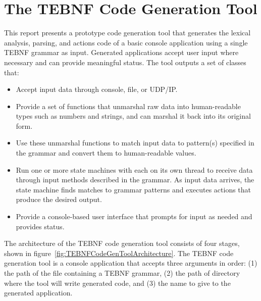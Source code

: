 \section{The TEBNF Code Generation Tool}
This report presents a prototype code generation tool that generates the lexical analysis, parsing, and actions code of a basic console application using a single TEBNF grammar as input.  Generated applications accept user input where necessary and can provide meaningful status.  The tool outputs a set of classes that:
\begin{itemize}
  \item Accept input data through console, file, or UDP/IP.
  \item Provide a set of functions that unmarshal raw data into human-readable types such as numbers and strings, and can marshal it back into its original form.
  \item Use these unmarshal functions to match input data to pattern(s) specified in the grammar and convert them to human-readable values.
  \item Run one or more state machines with each on its own thread to receive data through input methods described in the grammar.  As input data arrives, the state machine finds matches to grammar patterns and executes actions that produce the desired output.
  \item Provide a console-based user interface that prompts for input as needed and provides status.
\end{itemize}

\indent
The architecture of the TEBNF code generation tool consists of four stages, shown in figure~\ref{fig:TEBNFCodeGenToolArchitecture}.  The TEBNF code generation tool is a console application that accepts three arguments in order: (1) the path of the file containing a TEBNF grammar, (2) the path of directory where the tool will write generated code, and (3) the name to give to the generated application.

